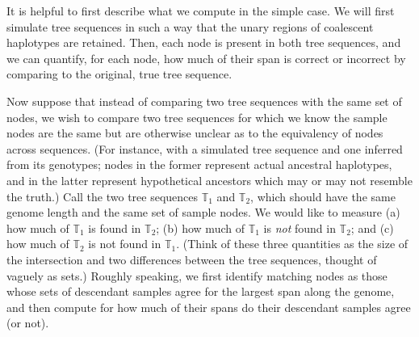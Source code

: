 \documentclass[10pt,twoside,lineno]{gsajnl}
\newcommand{\T}{\mathbb{T}}
\begin{document}
It is helpful to first describe what we compute in the simple case.
We will first simulate tree sequences in such a way that
the unary regions of coalescent haplotypes are retained.
Then, each node is present in both tree sequences,
and we can quantify, for each node, how much of their span is correct or incorrect
by comparing to the original, true tree sequence.

Now suppose that instead of comparing two tree sequences with the same set of nodes,
we wish to compare two tree sequences for which we know the sample nodes are the same
but are otherwise unclear as to the equivalency of nodes across sequences.
(For instance, with a simulated tree sequence and one inferred from its genotypes;
nodes in the former represent actual ancestral haplotypes, and in the latter
represent hypothetical ancestors which may or may not resemble the truth.)
Call the two tree sequences $\T_1$ and $\T_2$, which should have the same genome length
and the same set of sample nodes.
We would like to measure (a) how much of $\T_1$ is found in $\T_2$;
(b) how much of $\T_1$ is \emph{not} found in $\T_2$; and
(c) how much of $\T_2$ is not found in $\T_1$.
(Think of these three quantities as the size of the intersection
and two differences between the tree sequences,
thought of vaguely as sets.)
Roughly speaking, we first identify matching nodes
as those whose sets of descendant samples agree for the largest span along the genome,
and then compute for how much of their spans do their descendant samples agree (or not).
\end{document}
